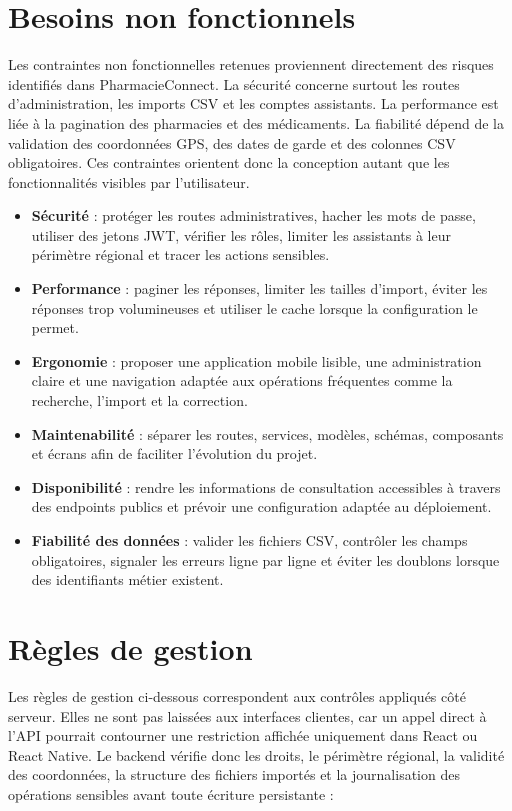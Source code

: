 \section{Besoins non fonctionnels}

Les contraintes non fonctionnelles retenues proviennent directement des risques identifiés dans
PharmacieConnect. La sécurité concerne surtout les routes d'administration, les imports CSV et les comptes
assistants. La performance est liée à la pagination des pharmacies et des médicaments. La fiabilité dépend
de la validation des coordonnées GPS, des dates de garde et des colonnes CSV obligatoires. Ces contraintes
orientent donc la conception autant que les fonctionnalités visibles par l'utilisateur.

\begin{itemize}
    \item \textbf{Sécurité} : protéger les routes administratives, hacher les mots de passe, utiliser des jetons JWT,
    vérifier les rôles, limiter les assistants à leur périmètre régional et tracer les actions sensibles.
    \item \textbf{Performance} : paginer les réponses, limiter les tailles d'import, éviter les réponses trop
    volumineuses et utiliser le cache lorsque la configuration le permet.
    \item \textbf{Ergonomie} : proposer une application mobile lisible, une administration claire et une navigation
    adaptée aux opérations fréquentes comme la recherche, l'import et la correction.
    \item \textbf{Maintenabilité} : séparer les routes, services, modèles, schémas, composants et écrans afin de
    faciliter l'évolution du projet.
    \item \textbf{Disponibilité} : rendre les informations de consultation accessibles à travers des endpoints publics
    et prévoir une configuration adaptée au déploiement.
    \item \textbf{Fiabilité des données} : valider les fichiers CSV, contrôler les champs obligatoires, signaler les
    erreurs ligne par ligne et éviter les doublons lorsque des identifiants métier existent.
\end{itemize}

\section{Règles de gestion}

Les règles de gestion ci-dessous correspondent aux contrôles appliqués côté serveur. Elles ne sont pas
laissées aux interfaces clientes, car un appel direct à l'API pourrait contourner une restriction affichée
uniquement dans React ou React Native. Le backend vérifie donc les droits, le périmètre régional, la validité
des coordonnées, la structure des fichiers importés et la journalisation des opérations sensibles avant toute
écriture persistante :

